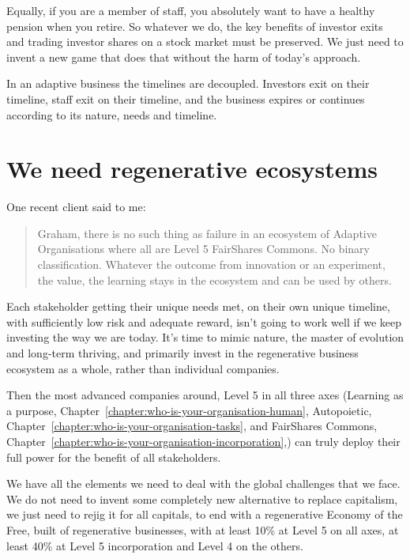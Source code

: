 Equally, if you are a member of staff, you absolutely want to have a healthy pension when you retire. So whatever we do, the key benefits of investor exits and trading investor shares on a stock market must be preserved. We just need to invent a new game that does that without the harm of today's approach.


In an adaptive business the timelines are decoupled. Investors exit on their timeline, staff exit on their timeline, and the business expires or continues according to its nature, needs and timeline.


\section{We need regenerative ecosystems}
\label{section:incubating-regenerative-ecosystems} 


One recent client said to me: 


\begin{quote}
Graham, there is no such thing as failure in an ecosystem of Adaptive Organisations where all are Level 5 FairShares Commons. No binary classification. Whatever the outcome from innovation or an experiment, the value, the learning stays in the ecosystem and can be used by others. 
\end{quote}


Each stakeholder getting their unique needs met, on their own unique timeline, with sufficiently low risk and adequate reward, isn't going to work well if we keep investing the way we are today. It's time to mimic nature, the master of evolution and long-term thriving, and primarily invest in the regenerative business ecosystem as a whole, rather than individual companies. 


Then the most advanced companies around, Level 5 in all three axes (Learning as a purpose, Chapter~\ref{chapter:who-is-your-organisation-human}, Autopoietic, Chapter~\ref{chapter:who-is-your-organisation-tasks}, and FairShares Commons, Chapter~\ref{chapter:who-is-your-organisation-incorporation},) can truly deploy their full power for the benefit of all stakeholders.


We have all the elements we need to deal with the global challenges that we face. We do not need to invent some completely new alternative to replace capitalism, we just need to rejig it for all capitals, to end with a regenerative Economy of the Free, built of regenerative businesses, with at least 10\% at Level 5 on all axes, at least 40\% at Level 5 incorporation and Level 4 on the others.


